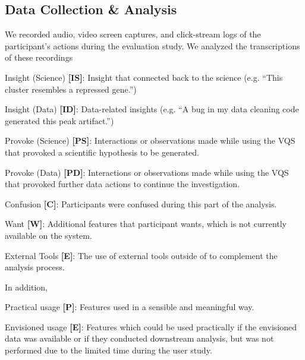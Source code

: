 \subsection{Data Collection \& Analysis}
We recorded audio, video screen captures, and click-stream logs of the participant's actions during the evaluation study. We analyzed the transcriptions of these recordings  
\begin{denselist}
    \item Insight (Science) \textbf{[IS]}: Insight that connected back to the science (e.g. ``This cluster resembles a repressed gene.'')
    \item Insight (Data) \textbf{[ID]}: Data-related insights (e.g. ``A bug in my data cleaning code generated this peak artifact.'')
    \item Provoke (Science) \textbf{[PS]}: Interactions or observations made while using the VQS that provoked a scientific hypothesis to be generated.
    \item Provoke (Data) \textbf{[PD]}: Interactions or observations made while using the VQS that provoked further data actions to continue the investigation.
    \item Confusion \textbf{[C]}: Participants were confused during this part of the analysis.
    \item Want \textbf{[W]}: Additional features that participant wants, which is not currently available on the system.
    \item External Tools \textbf{[E]}: The use of external tools outside of \zv to complement the analysis process.
\end{denselist}
\npar In addition,  
\begin{denselist}
    \item Practical usage \textbf{[P]}: Features used in a sensible and meaningful way.
    \item Envisioned usage \textbf{[E]}: Features which could be used practically if the envisioned data was available or if they conducted downstream analysis, but was not performed due to the limited time during the user study. 
    \item {}
\end{denselist}

